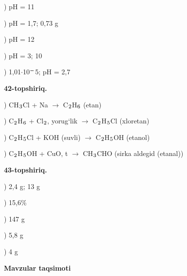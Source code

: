 \documentclass[11pt,a4paper]{article}
\renewcommand{\textsubscript}[1]{\ensuremath{_{\text{\fontsize{8}{8}\selectfont #1}}}}
\renewcommand{\textsuperscript}[1]{\ensuremath{^{\text{\fontsize{8}{8}\selectfont #1}}}}
\begin{document}
) pH = 11\par
{}) pH = 1,7; 0,73 g\par
{}) pH = 12\par
{}) pH = 3; 10\par
{}) 1,01$\cdot$10\textsuperscript{$-$}5; pH = 2,7\par
\noindent\textbf{42-topshiriq.}\par
{}) CH\textsubscript{3}Cl + Na $\to$ C\textsubscript{2}H\textsubscript{6} (etan)\par
{}) C\textsubscript{2}H\textsubscript{6} + Cl\textsubscript{2}, yorug`lik $\to$ C\textsubscript{2}H\textsubscript{5}Cl (xloretan)\par
{}) C\textsubscript{2}H\textsubscript{5}Cl + KOH (suvli) $\to$ C\textsubscript{2}H\textsubscript{5}OH (etanol)\par
{}) C\textsubscript{2}H\textsubscript{5}OH + CuO, t\textdegree{} $\to$ CH\textsubscript{3}CHO (sirka aldegid (etanal))\par
\noindent\textbf{43-topshiriq.}\par
{}) 2,4 g; 13 g\par
{}) 15,6\%\par
{}) 147 g\par
{}) 5,8 g\par
{}) 4 g\par
\par\bigskip\noindent\textbf{Mavzular taqsimoti}\par\smallskip
\end{document}
